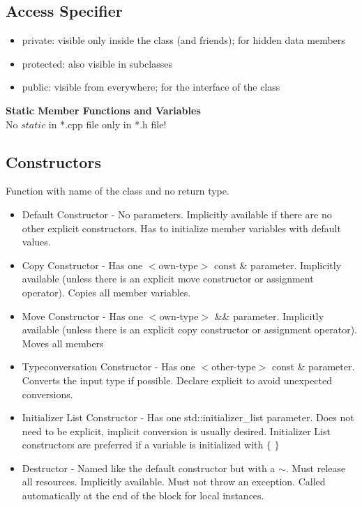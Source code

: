 \subsection{Access Specifier}
\begin{itemize}
  \itemsep -0.5em 
  \item private: visible only inside the class (and friends); for hidden data members
  \item protected: also visible in subclasses 
  \item public: visible from everywhere; for the interface of the class
\end{itemize}

\textbf{Static Member Functions and Variables}\\
No $static$ in *.cpp file only in *.h file!

\subsection{Constructors}
Function with name of the class and no return type. 
\begin{itemize}
    \item Default Constructor - No parameters. Implicitly available if there are no other explicit constructors. Has to initialize member variables with default values.
    \item Copy Constructor - Has one $<$own-type$>$ const \& parameter. Implicitly available (unless there is an explicit move constructor or assignment operator). Copies all member variables.
    \item Move Constructor - Has one $<$own-type$>$ \&\& parameter. Implicitly available (unless there is an explicit copy constructor or assignment operator). Moves all members
    \item Typeconversation Constructor - Has one $<$other-type$>$ const \& parameter. Converts the input type if possible. Declare explicit to avoid unexpected conversions.
    \item Initializer List Constructor - Has one std::initializer\_list parameter. Does not need to be explicit, implicit conversion is usually desired. Initializer List constructors are preferred if a variable is initialized with $\{$ $\}$
    \item Destructor - Named like the default constructor but with a $\sim$. Must release all resources. Implicitly available. Must not throw an exception. Called automatically at the end of the block for local instances.
\end{itemize}

